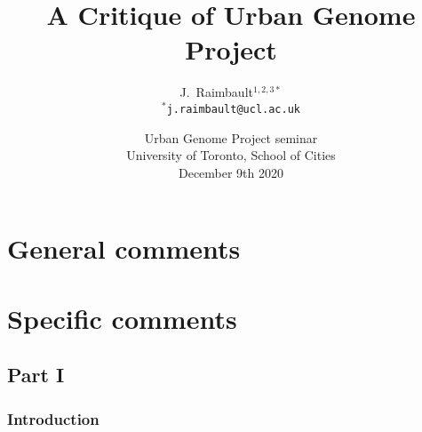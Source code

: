 



\title[A Critique of Urban Genome Project]{A Critique of Urban Genome Project}
\author[Raimbault]{J.~Raimbault$^{1,2,3\ast}$\\\medskip
$^{\ast}$\texttt{j.raimbault@ucl.ac.uk}
}



\date[July 18th 2020]{Urban Genome Project seminar\\
University of Toronto, School of Cities\\
December 9th 2020
}

\frame{\maketitle}



%

\section{General comments}





\section{Specific comments}


\subsection{Part I}

\subsubsection{Introduction}


